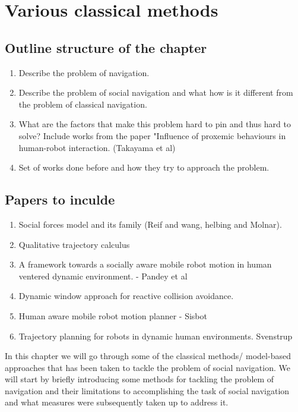 \section{Various classical methods}

\subsection*{Outline structure of the chapter}
\begin{enumerate}
    \item Describe the problem of navigation.
    \item Describe the problem of social navigation and what how is it different from the problem of classical navigation.

    \item What are the factors that make this problem hard to pin and thus hard to solve? Include works from the paper "Influence of proxemic behaviours in human-robot interaction. (Takayama et al)
    \item Set of works done before and how they try to approach the problem.
\end{enumerate}

\subsection*{Papers to inculde}
    \begin{enumerate}
        \item Social forces model and its family (Reif and wang, helbing and Molnar).
        \item Qualitative trajectory calculus
        \item A framework towards a socially aware mobile robot motion in human ventered dynamic environment. - Pandey et al
        \item Dynamic window approach for reactive collision avoidance.
        \item Human aware mobile robot motion planner - Sisbot
        \item Trajectory planning for robots in dynamic human environments. Svenstrup
    \end{enumerate}



In this chapter we will go through some of the classical methods/ model-based approaches that has been taken to tackle the problem of social navigation. We will start by briefly introducing some methods for tackling the problem of navigation and their limitations to accomplishing the task of social navigation and what measures were subsequently taken up to address it.

